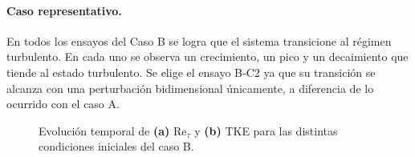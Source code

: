 \paragraph{Caso representativo.} En todos los ensayos del Caso B se logra que el sistema transicione al régimen turbulento. En cada uno se observa un crecimiento, un pico y un decaimiento que tiende al estado turbulento. Se elige el ensayo B‑C2 ya que su transición se alcanza con una perturbación bidimensional  únicamente, a diferencia de lo ocurrido con el caso A.   

\begin{table}[H]
\centering
\caption{Parámetros de las condiciones iniciales para el caso B (Re$_o$ = 5000, Pr = 0.71, Ri$_b$ = 1.06).}
\label{tab:grupo2}
\end{table}

\begin{figure}[H]
  \centering  

  \caption{Evolución temporal de \textbf{(a)} Re$_{\tau}$ y \textbf{(b)} TKE para las distintas condiciones iniciales del caso B.}
  \label{fig:case-B-Re5000-Pr071}
\end{figure}


